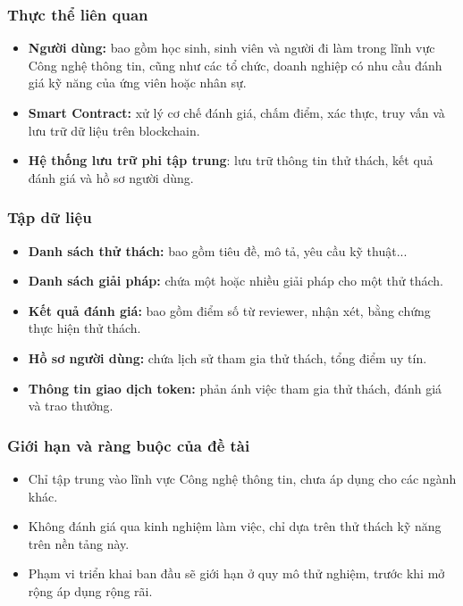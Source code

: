 \documentclass{article}[14pt]
\begin{document}
{    \subsubsection{Thực thể liên quan}
    \begin{itemize}
        \large
        \item \textbf{Người dùng:} bao gồm học sinh, sinh viên và người đi làm trong lĩnh vực Công nghệ thông tin, cũng như các tổ chức, doanh nghiệp có nhu cầu đánh giá kỹ năng của ứng viên hoặc nhân sự.
        \item \textbf{Smart Contract:} xử lý cơ chế đánh giá, chấm điểm, xác thực, truy vấn và lưu trữ dữ liệu trên blockchain.
        \item \textbf{Hệ thống lưu trữ phi tập trung}: lưu trữ thông tin thử thách, kết quả đánh giá và hồ sơ người dùng.
    \end{itemize}

    \subsubsection{Tập dữ liệu}
    \begin{itemize}
        \large
        \item \textbf{Danh sách thử thách:} bao gồm tiêu đề, mô tả, yêu cầu kỹ thuật...
        \item \textbf{Danh sách giải pháp:} chứa một hoặc nhiều giải pháp cho một thử thách.
        \item \textbf{Kết quả đánh giá:} bao gồm điểm số từ reviewer, nhận xét, bằng chứng thực hiện thử thách.
        \item \textbf{Hồ sơ người dùng:} chứa lịch sử tham gia thử thách, tổng điểm uy tín.
        \item \textbf{Thông tin giao dịch token:} phản ánh việc tham gia thử thách, đánh giá và trao thưởng.
    \end{itemize}

    \subsubsection{Giới hạn và ràng buộc của đề tài}
    \begin{itemize}
        \large
        \item Chỉ tập trung vào lĩnh vực Công nghệ thông tin, chưa áp dụng cho các ngành khác.
        \item Không đánh giá qua kinh nghiệm làm việc, chỉ dựa trên thử thách kỹ năng trên nền tảng này.
        \item Phạm vi triển khai ban đầu sẽ giới hạn ở quy mô thử nghiệm, trước khi mở rộng áp dụng rộng rãi.
    \end{itemize}

}
\end{document}
